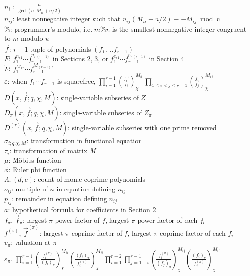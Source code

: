 \documentclass[11pt,letterpaper]{article}
\theoremstyle{definition}
\theoremstyle{remark}
\numberwithin{equation}{section}
\theoremstyle{dotless}
\newcommand{\res}[2]{\left(\frac{#1}{#2}\right)}
\renewcommand{\tilde}{\widetilde}
\begin{document}
$n_i$ : $\frac{n}{\gcd(n, M_{ii}+n/2)}$ \\
$n_{ij}$: least nonnegative integer such that $n_{ij}(M_{ii}+n/2) \equiv -M_{ij} \bmod n$ \\
$\%$: programmer's modulo, i.e. $m\% n$ is the smallest nonnegative integer congruent to $m$ modulo $n$ \\
$\vec{f}$: $r-1$ tuple of polynomials $(f_1, \ldots f_{r-1})$  \\
$F$: $f_1^{n_{r1}}\cdots f_{r-1}^{n_{r \, (r-1)}}$ in Sections 2, 3, or $f_1^{e_{r1}}\cdots f_{r-1}^{e_{r \, (r-1)}}$ in Section 4\\
$\tilde{F}$: $f_1^{M_{1r}}\cdots f_{r-1}^{M_{(r-1) \, r}}$ \\
$\varepsilon$: when $f_1\cdots f_{r-1}$ is squarefree, $\prod_{i=1}^{r-1} \res{f_i'}{f_i}_{\chi}^{M_{ii}} \, \prod_{1 \leq i < j \leq r-1} \res{f_i}{f_j}_{\chi}^{M_{ij}}$  \\
$D(x, \vec{f}; q, \chi, M)$: single-variable subseries of $Z$ \\
$D_\pi(x, \vec{f}; q, \chi, M)$: single-variable subseries of $Z_\pi$ \\
$D^{(\pi)}(x, \vec{f}; q, \chi, M)$: single-variable subseries with one prime removed \\
$\sigma_{i; q, \chi, M}$: transformation in functional equation \\
$\tau_i$: transformation of matrix $M$ \\
$\mu$: M\"obius function \\
$\phi$: Euler phi function \\
$\Lambda_{\pi}(d,e)$: count of monic coprime polynomials \\
$o_{ij}$: multiple of $n$ in equation defining $n_{ij}$  \\
$p_{ij}$: remainder in equation defining $n_{ij}$ \\
$\bar{a}$: hypothetical formula for coefficients in Section 2 \\
$f_\pi$, $\vec{f}_\pi$: largest $\pi$-power factor of $f$, largest $\pi$-power factor of each $f_i$  \\
$f^{(\pi)}$, $\vec{f}^{(\pi)}$: largest $\pi$-coprime factor of $f$, largest $\pi$-coprime factor of each $f_i$  \\
$v_\pi$: valuation at $\pi$ \\
$\varepsilon_\pi$: $\prod\limits_{i=1}^{r-1} \res{f_i^{(\pi)}}{(f_i)_\pi}_{\chi}^{M_{ii}} \res{(f_i)_\pi}{f_i^{(\pi)}}_{\chi}^{M_{ii}} \prod\limits_{i=1}^{r-2}\prod\limits_{j=1+i}^{r-1}\res{f_i^{(\pi)}}{(f_j)_\pi}_{\chi}^{M_{ij}} \res{(f_i)_\pi}{f_j^{(\pi)}}_{\chi}^{M_{ij}}$ \\
\end{document}
